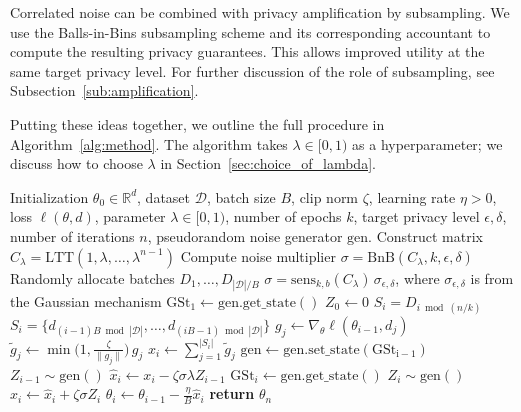 \documentclass{article}
\theoremstyle{plain}
\theoremstyle{definition}
\theoremstyle{remark}
\newcommand{\method}{DP-$\lambda$CGD\xspace}
\begin{document}
Correlated noise can be combined with privacy amplification by subsampling. We use the
Balls-in-Bins subsampling scheme and its corresponding accountant \citep{choquette2024near}
to compute the resulting privacy guarantees. This allows improved utility at the same
target privacy level. For further discussion of the role of subsampling, see
Subsection~\ref{sub:amplification}.

Putting these ideas together, we outline the full procedure in
Algorithm~\ref{alg:method}. The algorithm takes $\lambda \in [0,1)$ as a hyperparameter; we discuss how to choose $\lambda$ in Section~\ref{sec:choice_of_lambda}.


\begin{algorithm}[t!]
\caption{\method}
\label{alg:method}
\begin{algorithmic}[1]
\REQUIRE Initialization $\theta_0 \in \mathbb{R}^d$, dataset $\mathcal{D}$, batch size $B$, clip norm $\zeta$, learning rate $\eta>0$, loss $\ell(\theta,d)$, parameter $\lambda \in [0,1)$, number of epochs $k$, target privacy level $\epsilon,\delta$, number of iterations $n$, pseudorandom noise generator $\mathrm{gen}$.
\STATE Construct matrix $C_{\lambda} = \mathrm{LTT}(1, \lambda, \dots, \lambda^{n-1})$
    \STATE Compute noise multiplier $\sigma = \mathrm{BnB}(C_{\lambda}, k, \epsilon, \delta)$
    \STATE Randomly allocate batches $D_1, \dots, D_{|\mathcal{D}|/B}$ 
    \STATE $\sigma = \mathrm{sens}_{k,b}(C_{\lambda})\,\sigma_{\epsilon,\delta}$, where $\sigma_{\epsilon,\delta}$ is from the Gaussian mechanism
\ENDIF
\STATE $\mathrm{GSt}_1 \gets \mathrm{gen.get\_state()}$
\STATE $Z_0 \xleftarrow{} 0$
    \STATE \qquad {}
        \STATE $S_i = D_{i \bmod (n/k)}$
        \STATE $S_i = \{d_{(i-1)B \bmod |\mathcal{D}|},\dots,d_{(iB-1) \bmod |\mathcal{D}|}\}$
    \ENDIF
        \STATE $g_j \gets \nabla_\theta \ell(\theta_{i-1}, d_j)$
        \STATE $\tilde g_j \gets \min\!\bigl(1, \frac{\zeta}{\|g_j\|}\bigr)\, g_j$ \quad {}
    \ENDFOR
    \STATE $x_i \gets \sum_{j=1}^{|S_i|} \tilde g_j$ \qquad {}
    \STATE $\mathrm{gen} \gets \mathrm{gen.set\_state(\mathrm{GSt}_{i -1} )}$
    \STATE $Z_{i-1} \sim \mathrm{gen}()$ \qquad {}
    \ENDIF
    \STATE $\hat x_i \gets x_i - \zeta\sigma \lambda Z_{i-1}$
    \STATE $\mathrm{GSt}_i \gets \mathrm{gen.get\_state()}$
    \STATE $Z_i \sim \mathrm{gen}()$ \qquad {}
    \STATE $\hat x_i \gets \hat x_i + \zeta\sigma Z_i$
    \STATE $\theta_i \gets \theta_{i-1} - \frac{\eta}{B}\hat x_i$ \qquad {}
\ENDFOR
\STATE \textbf{return} $\theta_n$
\end{algorithmic}
\end{algorithm}
\end{document}
